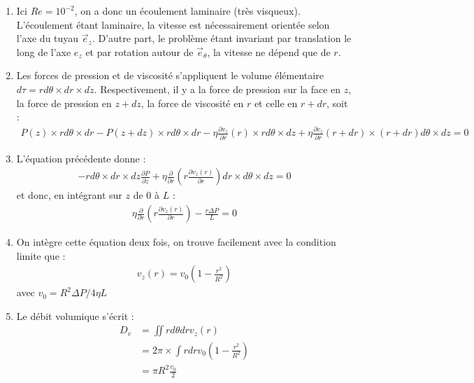 \begin{correction}

\begin{enumerate}

	\item Ici $Re=10^{-2}$, on a donc un écoulement laminaire (très visqueux). L'écoulement étant laminaire, la vitesse est nécessairement orientée selon l'axe du tuyau $\vec{e}_z$. D'autre part, le problème étant invariant par translation le long de l'axe $e_z$ et par rotation autour de $\vec{e}_\theta$, la vitesse ne dépend que de $r$.

	\item Les forces de pression et de viscosité s'appliquent le volume élémentaire $d\tau=rd\theta\times dr\times dz$. Respectivement, il y a la force de pression sur la face en $z$, la force de pression en $z+dz$, la force de viscosité en $r$ et celle en $r+dr$, soit :
	\begin{align*}
		P(z)\times rd\theta\times dr - P(z+dz)\times rd\theta\times dr - \eta\frac{\partial v_z}{\partial r}(r)\times rd\theta\times dz + \eta\frac{\partial v_z}{\partial r}(r+dr)\times (r+dr)d\theta\times dz=0
	\end{align*}
	
	\item L'équation précédente donne :
	\begin{align*}
		-rd\theta\times dr\times dz\frac{\partial P}{\partial z}+\eta\frac{\partial}{\partial r}\left( r\frac{\partial v_z(r)}{\partial r}\right) dr\times d\theta\times dz=0
	\end{align*}
	et donc, en intégrant sur $z$ de $0$ à $L$ :
	\begin{align*}
		\eta\frac{\partial}{\partial r}\left( r\frac{\partial v_z(r)}{\partial r}\right) -\frac{r\Delta P}{L}=0
	\end{align*}

	\item On intègre cette équation deux fois, on trouve facilement avec la condition limite que :
	\begin{align*}
		v_z(r)=v_0\left(1-\frac{r^2}{R^2} \right) 
	\end{align*}
	avec $v_0=R^2\Delta P/4\eta L$
	
	\item Le débit volumique s'écrit :
	\begin{align*}
		D_v&=\iint rd\theta drv_z(r) \\
		&=2\pi\times\int rdrv_0\left(1-\frac{r^2}{R^2} \right) \\
		&=\pi R^2\frac{v_0}{2} 
	\end{align*}
	

\end{enumerate}
\end{correction}
